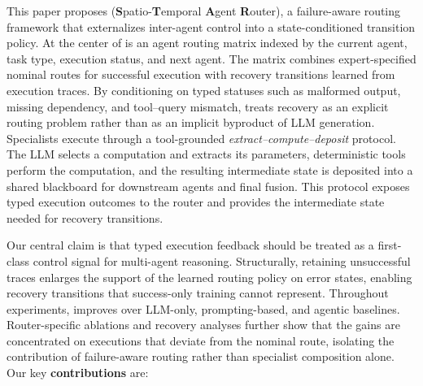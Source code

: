 This paper proposes \starname{} (\textbf{S}patio-\textbf{T}emporal \textbf{A}gent \textbf{R}outer), a failure-aware routing framework that externalizes inter-agent control into a state-conditioned transition policy.
At the center of \starname{} is an agent routing matrix indexed by the current agent, task type, execution status, and next agent.
The matrix combines expert-specified nominal routes for successful execution with recovery transitions learned from execution traces.
By conditioning on typed statuses such as malformed output, missing dependency, and tool--query mismatch, \starname{} treats recovery as an explicit routing problem rather than as an implicit byproduct of LLM generation. Specialists execute through a tool-grounded \emph{extract--compute--deposit} protocol.
The LLM selects a computation and extracts its parameters, deterministic tools perform the computation, and the resulting intermediate state is deposited into a shared blackboard for downstream agents and final fusion.
This protocol exposes typed execution outcomes to the router and provides the intermediate state needed for recovery transitions.

Our central claim is that typed execution feedback should be treated as a first-class control signal for multi-agent reasoning.
Structurally, retaining unsuccessful traces enlarges the support of the learned routing policy on error states, enabling recovery transitions that success-only training cannot represent.
Throughout experiments, \starname{} improves over LLM-only, prompting-based, and agentic baselines.
Router-specific ablations and recovery analyses further show that the gains are concentrated on executions that deviate from the nominal route, isolating the contribution of failure-aware routing rather than specialist composition alone. Our key \textbf{contributions} are:

